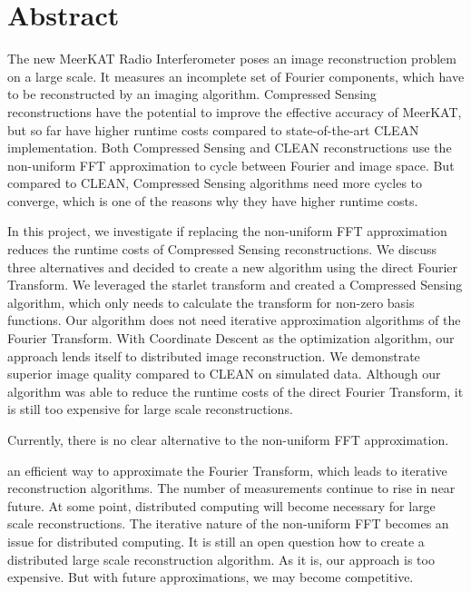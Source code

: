 \section*{Abstract}
The new MeerKAT Radio Interferometer poses an image reconstruction problem on a large scale. It measures an incomplete set of Fourier components, which have to be reconstructed by an imaging algorithm.  Compressed Sensing reconstructions have the potential to improve the effective accuracy of MeerKAT, but so far have higher runtime costs compared to state-of-the-art CLEAN implementation. Both Compressed Sensing and CLEAN reconstructions use the non-uniform FFT approximation to cycle between Fourier and image space. But compared to CLEAN, Compressed Sensing algorithms need more cycles to converge, which is one of the reasons why they have higher runtime costs.

In this project, we investigate if replacing the non-uniform FFT approximation reduces the runtime costs of Compressed Sensing reconstructions. We discuss three alternatives and decided to create a new algorithm using the direct Fourier Transform. We leveraged the starlet transform and created a Compressed Sensing algorithm, which only needs to calculate the transform for non-zero basis functions. Our algorithm does not need iterative approximation algorithms of the Fourier Transform. With Coordinate Descent as the optimization algorithm, our approach lends itself to distributed image reconstruction. We demonstrate superior image quality compared to CLEAN on simulated data. Although our algorithm was able to reduce the runtime costs of the direct Fourier Transform, it is still too expensive for large scale reconstructions.

Currently, there is no clear alternative to the non-uniform FFT approximation. 

 an efficient way to approximate the Fourier Transform, which leads to iterative reconstruction algorithms. The number of measurements continue to rise in near future. At some point, distributed computing will become necessary for large scale reconstructions. The iterative nature of the non-uniform FFT becomes an issue for distributed computing. It is still an open question how to create a distributed large scale reconstruction algorithm. As it is, our approach is too expensive. But with future approximations, we may become competitive.

